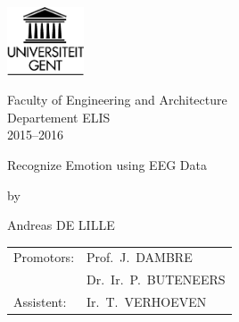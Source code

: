 

\begin{titlepage}

\setlength{\hoffset}{-1in}
\setlength{\voffset}{-1in}
\setlength{\topmargin}{1.5cm}
\setlength{\headheight}{0.5cm}
\setlength{\headsep}{1cm}
\setlength{\oddsidemargin}{3cm}
\setlength{\evensidemargin}{3cm}
\setlength{\footskip}{1.5cm}
\enlargethispage{1cm}


\fontsize{12pt}{14pt}
\selectfont

\begin{center}

\includegraphics[height=2cm]{fig/ruglogo}

\vspace{0.5cm}

Faculty of Engineering and Architecture\\
Departement ELIS\\
2015--2016 \\

\vspace{3.5cm}

\fontsize{17.28pt}{21pt}
\selectfont

Recognize Emotion using EEG Data

\fontsize{12pt}{14pt}
\selectfont

\vspace{.6cm}

by 

\vspace{.4cm}

Andreas DE LILLE

\vspace{3.5cm}


\begin{tabular}{ll}
Promotors: & Prof.~J.~DAMBRE\\
 & Dr.~Ir.~P.~BUTENEERS\\
Assistent: & Ir.~T.~VERHOEVEN\\
\end{tabular}
 

\vspace{3cm}


\end{center}
\end{titlepage}
